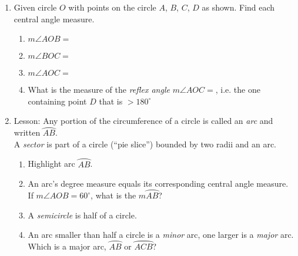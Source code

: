 \begin{enumerate}
\item Given circle $O$ with points on the circle $A$, $B$, $C$, $D$ as shown. Find each central angle measure.
\begin{multicols}{2}
  \begin{enumerate} 
    \item $m\angle AOB =$
    \item $m\angle BOC =$
    \item $m\angle AOC =$
    \item What is the measure of the \emph{reflex angle} $m\angle AOC =$, i.e. the one containing point $D$ that is $>180^\circ$
    \end{enumerate}
\end{multicols}

\item Lesson: Any portion of the circumference of a circle is called an \emph{arc} and written $\wideparen{AB}$. \\[0.25cm]
A \emph{sector} is part of a circle (``pie slice'') bounded by two radii and an arc.
  \begin{multicols}{2}
  \raggedcolumns
  \begin{enumerate}[itemsep=0.5cm]
    \item Highlight arc $\wideparen{AB}$.
    \item An arc's degree measure equals its corresponding central angle measure. \\[0.25cm]
    If $m\angle AOB = 60^\circ$, what is the $m \wideparen{AB}$?
    \item A \emph{semicircle} is half of a circle.
    \item An arc smaller than half a circle is a \emph{minor} arc, one larger is a \emph{major} arc. \\[0.25cm]
    Which is a major arc, $\wideparen{AB}$ or $\wideparen{ACB}$?
  \end{enumerate}
  \end{multicols}


\end{enumerate}
